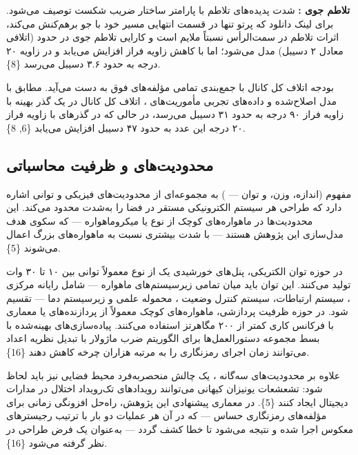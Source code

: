 \documentclass[a4paper,14pt]{extreport}
\begin{document}
\textbf{تلاطم جوی :} شدت پدیده‌های تلاطم  با پارامتر ساختار ضریب شکست  توصیف می‌شود. برای لینک دانلود  که پرتو تنها در قسمت انتهایی مسیر خود با جو برهم‌کنش می‌کند، اثرات تلاطم در سمت‌الرأس نسبتاً ملایم است و کارایی تلاطم جوی در حدود  (اتلافی معادل ۲ دسیبل) مدل می‌شود؛ اما با کاهش زاویه فراز افزایش می‌یابد و در زاویه ۲۰ درجه به حدود ۳.۶ دسیبل می‌رسد \{8\}.

بودجه اتلاف کل کانال با جمع‌بندی تمامی مؤلفه‌های فوق به دست می‌آید. مطابق با مدل اصلاح‌شده و داده‌های تجربی مأموریت‌های ، اتلاف کل کانال در یک گذر بهینه با زاویه فراز ۹۰ درجه به حدود ۳۱ دسیبل می‌رسد، در حالی که در گذرهای با زاویه فراز ۲۰ درجه این عدد به حدود ۴۷ دسیبل افزایش می‌یابد \{6, 8\}.
\subsection{محدودیت‌های  و ظرفیت محاسباتی}

مفهوم  (اندازه، وزن، و توان --- ) به مجموعه‌ای از محدودیت‌های فیزیکی و توانی اشاره دارد که طراحی هر سیستم الکترونیکی مستقر در فضا را به‌شدت محدود می‌کند. این محدودیت‌ها در ماهواره‌های کوچک از نوع  یا میکروماهواره --- که سکوی هدف مدل‌سازی این پژوهش هستند --- با شدت بیشتری نسبت به ماهواره‌های بزرگ اعمال می‌شوند \{5\}.

در حوزه توان الکتریکی، پنل‌های خورشیدی یک  از نوع  معمولاً توانی بین ۱۰ تا ۳۰ وات تولید می‌کنند. این توان باید میان تمامی زیرسیستم‌های ماهواره --- شامل رایانه مرکزی ، سیستم ارتباطات، سیستم کنترل وضعیت ، محموله علمی و زیرسیستم دما --- تقسیم شود. در حوزه ظرفیت پردازشی،  ماهواره‌های کوچک معمولاً از پردازنده‌های  یا معماری  با فرکانس کاری کمتر از ۲۰۰ مگاهرتز استفاده می‌کنند. پیاده‌سازی‌های بهینه‌شده با بسط مجموعه دستورالعمل‌ها  برای الگوریتم ضرب ماژولار با تبدیل نظریه اعداد  می‌توانند زمان اجرای رمزنگاری را به مرتبه هزاران چرخه کاهش دهند \{16\}.

علاوه بر محدودیت‌های سه‌گانه ، یک چالش منحصربه‌فرد محیط فضایی نیز باید لحاظ شود: تشعشعات یونیزان کیهانی  می‌توانند رویدادهای تک‌رویداد اختلال  در مدارات دیجیتال ایجاد کنند \{5\}. در معماری پیشنهادی این پژوهش، راه‌حل افزونگی زمانی  برای مؤلفه‌های رمزنگاری حساس --- که در آن هر عملیات دو بار با ترتیب رجیسترهای معکوس اجرا شده و نتیجه  می‌شود تا خطا کشف گردد --- به‌عنوان یک فرض طراحی در نظر گرفته می‌شود \{16\}.
\end{document}
